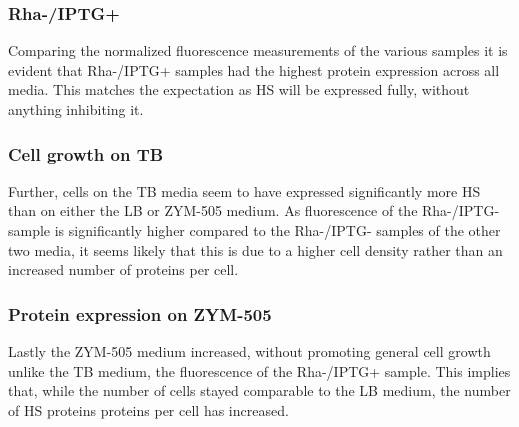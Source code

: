 \subsubsection{Rha-/IPTG+}

Comparing the normalized fluorescence measurements of the various samples it is
evident that Rha-/IPTG+ samples had the highest protein expression across all
media. This matches the expectation as HS will be expressed fully, without
anything inhibiting it.

\subsubsection{Cell growth on TB}

Further, cells on the TB media seem to have expressed significantly more HS
than on either the LB or ZYM-505 medium. As fluorescence of the Rha-/IPTG-
sample is significantly higher compared to the Rha-/IPTG- samples of the other
two media, it seems likely that this is due to a higher cell density rather
than an increased number of proteins per cell.

\subsubsection{Protein expression on ZYM-505}

Lastly the ZYM-505 medium increased, without promoting general cell growth
unlike the TB medium, the fluorescence of the Rha-/IPTG+ sample. This implies
that, while the number of cells stayed comparable to the LB medium, the number
of HS proteins proteins per cell has increased.
